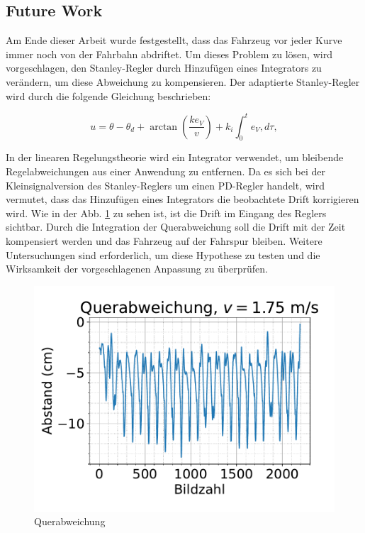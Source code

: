 \documentclass[arbeit=studie,oneside,BCOR=12mm]{ArbeitRST}
\begin{document}
\subsection{Future Work}

Am Ende dieser Arbeit wurde festgestellt, dass das Fahrzeug vor jeder Kurve
immer noch von der Fahrbahn abdriftet. Um dieses Problem zu lösen, wird
vorgeschlagen, den Stanley-Regler durch Hinzufügen eines Integrators zu
verändern, um diese Abweichung zu kompensieren. Der adaptierte Stanley-Regler
wird durch die folgende Gleichung beschrieben:

\begin{equation}
u = \theta - \theta_d + \arctan\left(\frac{ke_{V}}{v}\right) + k_{i} \int_{0}^{t} e_{V},d\tau,
\label{eq:Stanley-Regler-adjusted}
\end{equation}

In der linearen Regelungstheorie wird ein Integrator verwendet, um bleibende
Regelabweichungen aus einer Anwendung zu entfernen. Da es sich bei der
Kleinsignalversion des Stanley-Reglers um einen PD-Regler handelt, wird
vermutet, dass das Hinzufügen eines Integrators die beobachtete Drift
korrigieren wird. Wie in der Abb. \ref{quer} zu sehen ist, ist die Drift im Eingang
des Reglers sichtbar. Durch die Integration der Querabweichung soll die Drift
mit der Zeit kompensiert werden und das Fahrzeug auf der Fahrspur bleiben.
Weitere Untersuchungen sind erforderlich, um diese Hypothese zu testen und die
Wirksamkeit der vorgeschlagenen Anpassung zu überprüfen.

\begin{figure}[h]
    \centering
    \includegraphics[scale=0.7]{querabweichung}
    \caption{Querabweichung}
    \label{quer}
\end{figure}
\end{document}
